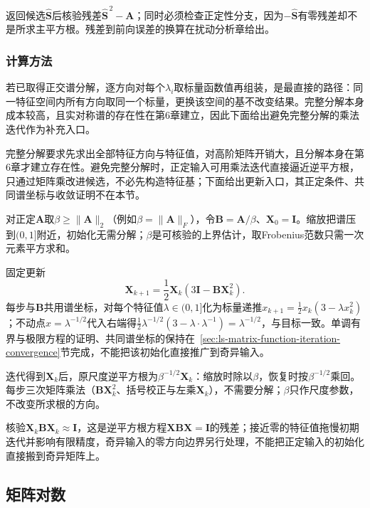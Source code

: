 返回候选$\widehat{\bm S}$后核验残差$\widehat{\bm S}^{\,2}-\bm A$；同时必须检查正定性分支，因为$-\widehat{\bm S}$有零残差却不是所求主平方根。残差到前向误差的换算在扰动分析章给出。

\subsubsection{计算方法}

若已取得正交谱分解，逐方向对每个$\lambda_i$取标量函数值再组装，是最直接的路径：同一特征空间内所有方向取同一个标量，更换该空间的基不改变结果。完整分解本身成本较高，且实对称谱的存在性在第6章建立，因此下面给出避免完整分解的乘法迭代作为补充入口。

完整分解要求先求出全部特征方向与特征值，对高阶矩阵开销大，且分解本身在第6章才建立存在性。避免完整分解时，正定输入可用乘法迭代直接逼近逆平方根，只通过矩阵乘改进候选，不必先构造特征基；下面给出更新入口，其正定条件、共同谱坐标与收敛证明不在本节。

对正定$\bm A$取$\beta\geq\lVert\bm A\rVert_2$（例如$\beta=\lVert\bm A\rVert_F$），令$\bm B=\bm A/\beta$、$\bm X_0=\bm I$。缩放把谱压到$(0,1]$附近，初始化无需分解；$\beta$是可核验的上界估计，取Frobenius范数只需一次元素平方求和。

固定更新
\begin{equation}
 \bm X_{k+1}=\frac12\bm X_k(3\bm I-\bm B\bm X_k^2).
 \label{eq:ls-inverse-rsqrt-iteration}
\end{equation}
每步与$\bm B$共用谱坐标，对每个特征值$\lambda\in(0,1]$化为标量递推$x_{k+1}=\frac12x_k(3-\lambda x_k^2)$；不动点$x=\lambda^{-1/2}$代入右端得$\frac12\lambda^{-1/2}(3-\lambda\cdot\lambda^{-1})=\lambda^{-1/2}$，与目标一致。单调有界与极限方程的证明、共同谱坐标的保持在~\ref{sec:ls-matrix-function-iteration-convergence}节完成，不能把该初始化直接推广到奇异输入。

迭代得到$\bm X_k$后，原尺度逆平方根为$\beta^{-1/2}\bm X_k$：缩放时除以$\beta$，恢复时按$\beta^{-1/2}$乘回。每步三次矩阵乘法（$\bm B\bm X_k^2$、括号校正与左乘$\bm X_k$），不需要分解；$\beta$只作尺度参数，不改变所求根的方向。

核验$\bm X_k\bm B\bm X_k\approx\bm I$，这是逆平方根方程$\bm X\bm B\bm X=\bm I$的残差；接近零的特征值拖慢初期迭代并影响有限精度，奇异输入的零方向边界另行处理，不能把正定输入的初始化直接搬到奇异矩阵上。

\subsection{矩阵对数}

